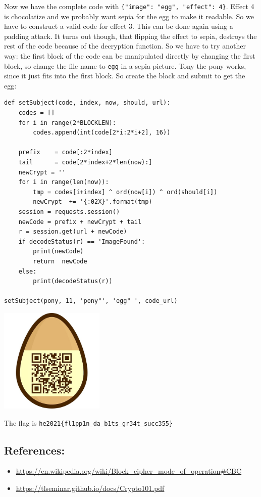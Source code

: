 \documentclass[english,a4paper,nols,noindent]{tufte-handout}
\begin{document}
Now we have the complete code with \verb+{"image": "egg", "effect": 4}+. Effect
4 is chocolatize and we probably want sepia for the egg to make it readable.
So we have to construct a valid code for effect 3.  This can be done again
using a padding attack.  It turns out though, that flipping the effect to
sepia, destroys the rest of the code because of the decryption function.  So we
have to try another way: the first block of the code can be manipulated
directly by changing the first block, so change the file name to \verb+egg+ in
a sepia picture.  Tony the pony works, since it just fits into the first block.
So create the block and submit to get the egg:

\begin{verbatim}
def setSubject(code, index, now, should, url):
    codes = []
    for i in range(2*BLOCKLEN):
        codes.append(int(code[2*i:2*i+2], 16))

    prefix    = code[:2*index]
    tail      = code[2*index+2*len(now):]
    newCrypt = ''
    for i in range(len(now)):
        tmp = codes[i+index] ^ ord(now[i]) ^ ord(should[i])
        newCrypt  += '{:02X}'.format(tmp)
    session = requests.session()
    newCode = prefix + newCrypt + tail
    r = session.get(url + newCode)
    if decodeStatus(r) == 'ImageFound':
        print(newCode)
        return  newCode
    else:
        print(decodeStatus(r))

setSubject(pony, 11, 'pony"', 'egg" ', code_url)
\end{verbatim}

\begin{marginfigure}
    \includegraphics[width=50mm]{ch30/egg.png}
\end{marginfigure}
 
The flag is \verb+he2021{fl1pp1n_da_b1ts_gr34t_succ355}+

\subsection{References:}
\begin{itemize}
\item \url{https://en.wikipedia.org/wiki/Block_cipher_mode_of_operation#CBC}
\item \url{https://tlseminar.github.io/docs/Crypto101.pdf}
\end{itemize}
\end{document}

